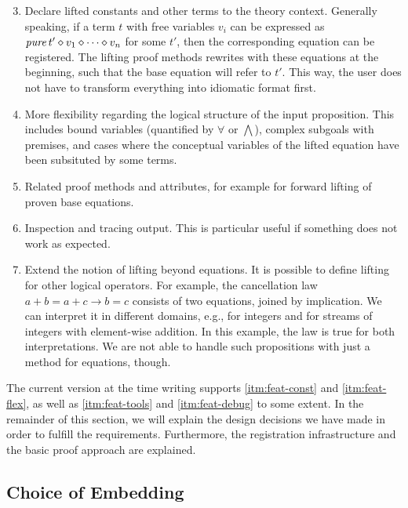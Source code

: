 \begin{enumerate}
\setcounter{enumi}{2}
\item\label{itm:feat-const}
	Declare lifted constants and other terms to the theory context.
	Generally speaking, if a term $t$ with free variables $v_i$ can be expressed
	as $\operatorname{\mathit{pure}} t' \diamond v_1 \diamond \cdots \diamond v_n$ for some $t'$, then the
	corresponding equation can be registered.
	The lifting proof methods rewrites with these equations at the beginning,
	such that the base equation will refer to $t'$.
	This way, the user does not have to transform everything into idiomatic
	format first.
\item\label{itm:feat-flex}
	More flexibility regarding the logical structure of the input proposition.
	This includes bound variables (quantified by $\forall$ or $\bigwedge$),
	complex subgoals with premises, and cases where the conceptual variables
	of the lifted equation have been subsituted by some terms.
\item\label{itm:feat-tools}
	Related proof methods and attributes, for example for forward lifting
	of proven base equations.
\item\label{itm:feat-debug}
	Inspection and tracing output.
	This is particular useful if something does not work as expected.
\item\label{itm:feat-xprops}
	Extend the notion of lifting beyond equations.
	It is possible to define lifting for other logical operators.
	For example, the cancellation law $a + b = a + c \longrightarrow b = c$
	consists of two equations, joined by implication.
	We can interpret it in different domains, e.g., for integers and for
	streams of integers with element-wise addition.
	In this example, the law is true for both interpretations.
	We are not able to handle such propositions with just a method for
	equations, though.
\end{enumerate}

The current version at the time writing supports \ref{itm:feat-const} and
\ref{itm:feat-flex}, as well as \ref{itm:feat-tools} and \ref{itm:feat-debug}
to some extent.
In the remainder of this section, we will explain the design decisions we
have made in order to fulfill the requirements.
Furthermore, the registration infrastructure and the basic proof approach are
explained.


\subsection{Choice of Embedding}\label{subsec:embedding}

